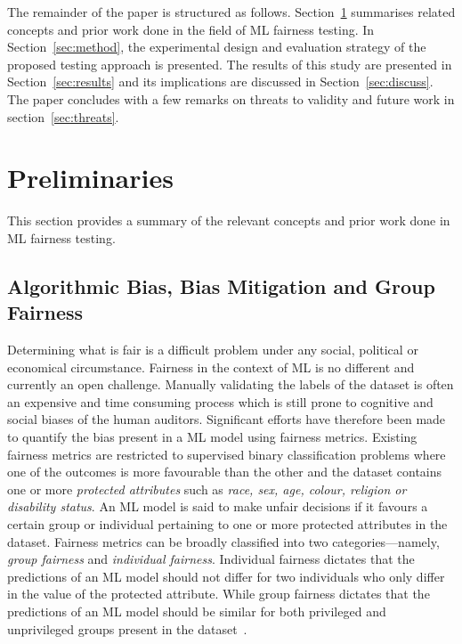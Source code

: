 \documentclass{article}
\begin{document}
The remainder of the paper is structured as
follows. Section \ref{sec:related} summarises related concepts and
prior work done in the field of ML fairness testing. In
Section \ref{sec:method}, the experimental design and evaluation
strategy of the proposed testing approach is presented. The results of
this study are presented in Section \ref{sec:results} and its
implications are discussed in Section \ref{sec:discuss}. The paper
concludes with a few remarks on threats to validity and future work in
section \ref{sec:threats}.

\section{Preliminaries}\label{sec:related}

This section provides a summary of the relevant concepts and prior
work done in ML fairness testing.

\subsection{Algorithmic Bias, Bias Mitigation and Group Fairness}\label{sec:bias-fairness}

Determining what is fair is a difficult problem under any social,
political or economical circumstance. Fairness in the context of ML is
no different and currently an open challenge. Manually validating the
labels of the dataset is often an expensive and time consuming process
which is still prone to cognitive and social biases of the human
auditors. Significant efforts have therefore been made to quantify the
bias present in a ML model using fairness metrics. Existing fairness
metrics are restricted to supervised binary classification problems
where one of the outcomes is more favourable than the other and the
dataset contains one or more \emph{protected attributes} such as
\emph{race, sex, age, colour, religion or disability status}. An ML
model is said to make unfair decisions if it favours a certain group
or individual pertaining to one or more protected attributes in the
dataset. Fairness metrics can be broadly classified into two
categories---namely, \emph{group fairness} and \emph{individual
fairness}. Individual fairness dictates that the predictions of an ML
model should not differ for two individuals who only differ in the
value of the protected attribute. While group fairness dictates that
the predictions of an ML model should be similar for both privileged
and unprivileged groups present in the
dataset \cite{castelnovo2022clarification,hellman2020measuring,mitchell2021algorithmic,kusner2017counterfactual,grgic2016case,dwork2012fairness,barocas2019fairness,barocas2016big,hardt2016equality,binns2018fairness,hutchinson201950,verma2018fairness,saxena2019fairness}.
\end{document}
